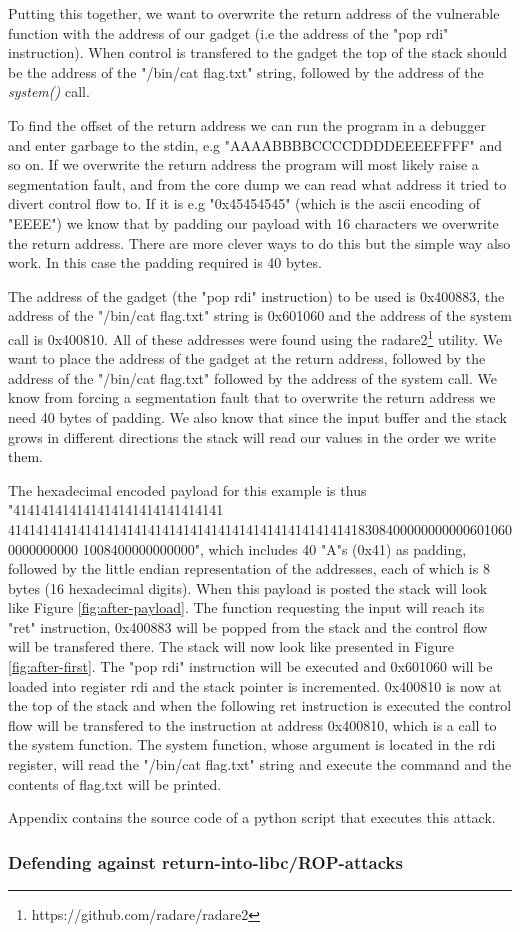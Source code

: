 Putting this together, we want to overwrite the return address of the vulnerable function
with the address of our gadget (i.e the address of the "pop rdi" instruction). When control
is transfered to the gadget the top of the stack should be the address of the "/bin/cat flag.txt"
string, followed by the address of the \textit{system()} call.

To find the offset of the return address we can run the program in a debugger and enter
garbage to the stdin, e.g "AAAABBBBCCCCDDDDEEEEFFFF" and so on. If we overwrite the return
address the program will most likely raise a segmentation fault, and from the core dump we
can read what address it tried to divert control flow to. If it is e.g "0x45454545" (which
is the ascii encoding of "EEEE") we know that by padding our payload with 16 characters we
overwrite the return address. There are more clever ways to do this but the simple way
also work. In this case the padding required is 40 bytes.

The address of the gadget (the "pop rdi" instruction) to be used is 0x400883, the address
of the "/bin/cat flag.txt" string is 0x601060 and the address of the system call is
0x400810. All of these addresses were found using the radare2\footnote{https://github.com/radare/radare2}
utility. We want to place the address of the gadget at the return address, followed by
the address of the "/bin/cat flag.txt" followed by the address of the system call. We know
from forcing a segmentation fault that to overwrite the return address we need 40 bytes of
padding. We also know that since the input buffer and the stack grows in different directions
the stack will read our values in the order we write them.

The hexadecimal encoded payload for this example is thus "414141414141414141414141414141
4141414141414141414141414141414141414141414141414183084000000000006010600000000000
1008400000000000", which includes 40 "A"s (0x41) as padding, followed by the little endian
representation of the addresses, each of which is 8 bytes (16 hexadecimal digits). When
this payload is posted the stack will look like Figure \ref{fig:after-payload}. The
function requesting the input will reach its "ret" instruction, 0x400883 will be popped
from the stack and the control flow will be transfered there. The stack will now look like
presented in Figure \ref{fig:after-first}. The "pop rdi" instruction will be executed and
0x601060 will be loaded into register rdi and the stack pointer is incremented. 0x400810
is now at the top of the stack and when the following ret instruction is executed the
control flow will be transfered to the instruction at address 0x400810, which is a call
to the system function. The system function, whose argument is located in the rdi register,
will read the "/bin/cat flag.txt" string and execute the command and the contents of
flag.txt will be printed.

Appendix  contains the source code of a python script that
executes this attack.

\subsubsection{Defending against return-into-libc/ROP-attacks}



